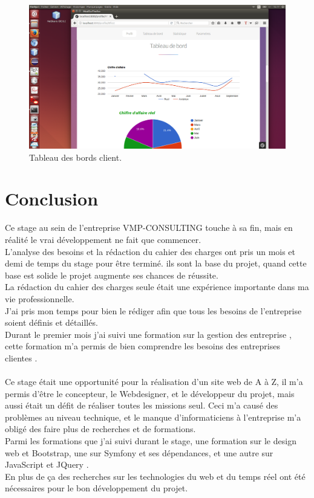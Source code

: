 \documentclass[12pt]{article}
\begin{document}
\begin{figure}[htp]
  \centering
  \includegraphics[width=12cm]{t11.png}
  \caption{Tableau des bords client.}
  \label{fig:une-autre-image}
\end{figure}

 


\newpage
\section{Conclusion}

Ce stage au sein de l'entreprise VMP-CONSULTING touche à sa fin, mais en réalité le vrai développement ne fait que commencer.\\

L'analyse des besoins et la rédaction du cahier des charges ont pris un mois et demi de temps du stage  pour être terminé. ils sont la base du projet, quand cette base est solide le projet augmente ses chances de réussite. \\
La rédaction du cahier des charges seule était une expérience importante dans ma vie professionnelle.\\ 
J'ai pris mon temps pour bien le rédiger  afin que tous les besoins de l'entreprise soient définis et détaillés.\\
Durant le premier mois j'ai suivi une formation sur la gestion des entreprise , cette formation m'a permis de bien comprendre  les besoins des entreprises clientes .  \\ \\

Ce stage était une opportunité pour la réalisation d'un site web de A à Z, il m'a permis d’être le concepteur, le Webdesigner, et le développeur du projet, mais aussi était un défit de réaliser toutes les missions seul. Ceci m'a causé des problèmes au niveau technique, et le manque d'informaticiens à l'entreprise  m'a obligé des faire plus de recherches et de formations.\\
Parmi  les formations que j'ai suivi durant le stage, une formation  sur le design web et Bootstrap, une sur Symfony et ses dépendances, et une autre sur JavaScript et JQuery .\\ 
En plus de ça des recherches  sur  les technologies du web et du temps réel ont été nécessaires pour le bon développement du projet. \\ \\
\end{document}

